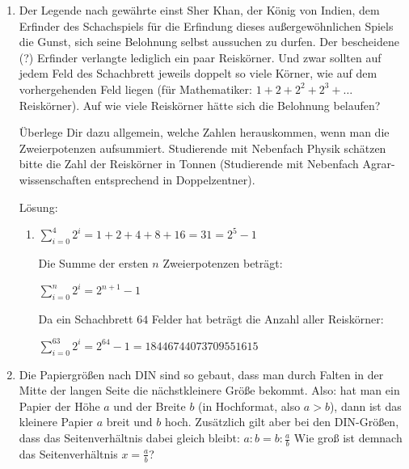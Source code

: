 \documentclass[../main.tex]{subfiles}
\begin{document}
\begin{enumerate}
	\item Der Legende nach gewährte einst Sher Khan, der König von Indien, dem Erfinder des Schachspiels für
	      die Erfindung dieses außergewöhnlichen Spiels die Gunst, sich seine Belohnung selbst aussuchen zu durfen.
	      Der bescheidene (?) Erfinder verlangte lediglich ein paar Reiskörner.
	      Und zwar sollten auf jedem Feld des Schachbrett jeweils doppelt so viele Körner,
	      wie auf dem vorhergehenden Feld liegen (für Mathematiker:
	      \(
	      1 + 2 + 2^2 + 2^3 + \dots
	      \)
	      Reiskörner). Auf wie viele Reiskörner hätte sich die Belohnung belaufen?

	      Überlege Dir dazu allgemein, welche Zahlen herauskommen, wenn man die
	      Zweierpotenzen aufsummiert. Studierende mit Nebenfach Physik schätzen
	      bitte die Zahl der Reiskörner in Tonnen (Studierende mit Nebenfach Agrar-
	      wissenschaften entsprechend in Doppelzentner).

	      Lösung:
	      \begin{enumerate}
		      \item
		            \(
		            \sum_{i=0}^{4} 2^i = 1 + 2 + 4 + 8 + 16 = 31 = 2^5 - 1
		            \)

		            Die Summe der ersten
		            \( n \)
		            Zweierpotenzen beträgt:

		            \(
		            \sum_{i=0}^{n} 2^i = 2^{n+1} - 1
		            \)

		            Da ein Schachbrett \(
		            64
		            \) Felder hat beträgt die Anzahl aller Reiskörner:

		            \(
		            \sum_{i=0}^{63} 2^i = 2^{64} - 1 = 18446744073709551615
		            \)
	      \end{enumerate}
	\item Die Papiergrößen nach DIN sind so gebaut, dass man durch Falten in der
	      Mitte der langen Seite die nächstkleinere Größe bekommt. Also: hat man ein
	      Papier der  Höhe \( a \)
	      und der Breite
	      \(
	      b
	      \)
	      (in Hochformat, also \(
	      a > b
	      \)),
	      dann ist
	      das kleinere Papier \(
	      a
	      \) breit und \(
	      b
	      \) hoch. Zusätzlich gilt aber bei den DIN-Größen,
	      dass das Seitenverhältnis dabei gleich bleibt:
	      \(
	      a : b = b : \frac{a}{b}
	      \) Wie groß ist demnach das Seitenverhältnis
	      \(
	      x = \frac{a}{b}
	      \)?


\end{enumerate}
\end{document}
